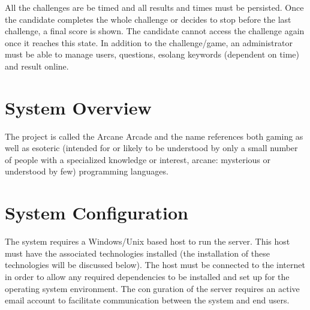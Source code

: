 \documentclass[english]{article}
\begin{document}
		All the challenges are be timed and all results and times must be persisted. Once the candidate completes the whole challenge or decides to stop before the last challenge, a final score is shown. The candidate cannot access the challenge again once it reaches this state. In addition to the challenge/game, an administrator must be able to manage users, questions, esolang keywords (dependent on time) and result online.
		
		
	\section{System Overview}
	The project is called the Arcane Arcade and the name references both gaming as well as esoteric (intended for or likely to be understood by only a 		small number of people with a specialized knowledge or interest, arcane: mysterious or understood by few) programming languages.
	
	\section{System Configuration}
	The system requires a Windows/Unix based host to run the server. This
host must have the associated technologies installed (the installation of these
technologies will be discussed below). The host must be connected to the
internet in order to allow any required dependencies to be installed and set
up for the operating system environment. The conguration of the server
requires an active email account to facilitate communication between the
system and end users.
	
\end{document}
